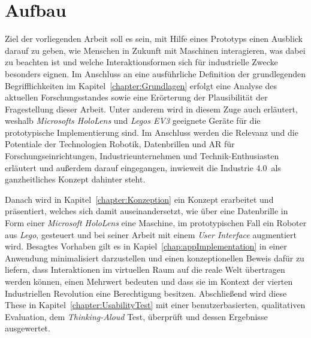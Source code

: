 \section{Aufbau}
Ziel der vorliegenden Arbeit soll es sein, mit Hilfe eines Prototyps einen Ausblick darauf zu geben, wie Menschen in Zukunft mit Maschinen interagieren, was dabei zu beachten ist und welche Interaktionsformen sich für industrielle Zwecke besonders eignen. Im Anschluss an eine ausführliche Definition der grundlegenden Begrifflichkeiten im Kapitel~\ref{chapter:Grundlagen} erfolgt eine Analyse des aktuellen Forschungsstandes sowie eine Erörterung der Plausibilität der Fragestellung dieser Arbeit. Unter anderem wird in diesem Zuge auch erläutert, weshalb \textit{Microsofts HoloLens} und \textit{Legos EV3} geeignete Geräte für die prototypische Implementierung sind. Im Anschluss werden die Relevanz und die Potentiale der Technologien Robotik, Datenbrillen und AR für Forschungseinrichtungen, Industrieunternehmen und Technik-Enthusiasten erläutert und außerdem darauf eingegangen, inwieweit die \frqq Industrie 4.0\flqq\ als ganzheitliches Konzept dahinter steht. 

Danach wird in Kapitel~\ref{chapter:Konzeption} ein Konzept erarbeitet und präsentiert, welches sich damit auseinandersetzt, wie über eine Datenbrille in Form einer \textit{Microsoft HoloLens} eine Maschine, im prototypischen Fall ein Roboter aus \textit{Lego}, gesteuert und bei seiner Arbeit mit einem \textit{User Interface} augmentiert wird. Besagtes Vorhaben gilt es in Kapiel~\ref{chap:appImplementation} in einer Anwendung minimalisiert darzustellen und einen konzeptionellen Beweis dafür zu liefern, dass Interaktionen im virtuellen Raum auf die reale Welt übertragen werden können, einen Mehrwert bedeuten und dass sie im Kontext der vierten Industriellen Revolution eine Berechtigung besitzen. Abschließend wird diese These in Kapitel~\ref{chapter:UsabilityTest} mit einer benutzerbasierten, qualitativen Evaluation, dem \textit{Thinking-Aloud} Test, überprüft und dessen Ergebnisse ausgewertet.